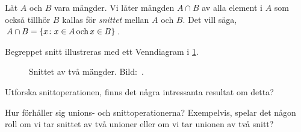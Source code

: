 \begin{definition}\label{def:Snitt}
  Låt \(A\) och \(B\) vara mängder.
  Vi låter mängden \(A\cap B\) av alla element i \(A\) som också tillhör
  \(B\) kallas för \emph{snittet} mellan \(A\) och \(B\).
  Det vill säga, \(A\cap B = \{x\colon x\in A\operatorname{och} x\in B\}\).
\end{definition}
Begreppet snitt illustreras med ett Venndiagram i \cref{fig:Snitt}.
\begin{figure}
  \caption{%
    Snittet av två mängder.
    Bild:~\cite{Wikipedia2013Set}.
  }\label{fig:Snitt}
\end{figure}

\begin{exercise}
  Utforska snittoperationen, finns det några intressanta resultat om detta?
\end{exercise}

\begin{exercise}
  Hur förhåller sig unions- och snittoperationerna?
  Exempelvis, spelar det någon roll om vi tar snittet av två unioner eller om 
  vi tar unionen av två snitt?
\end{exercise}

